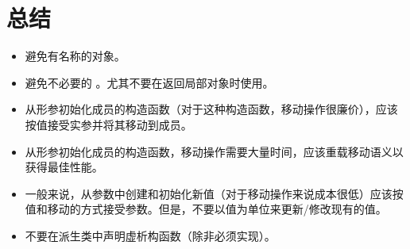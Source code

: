 \section{总结}
\begin{itemize}
	\item 避免有名称的对象。
	\item 避免不必要的 。尤其不要在返回局部对象时使用。
	\item 从形参初始化成员的构造函数（对于这种构造函数，移动操作很廉价），应该按值接受实参并将其移动到成员。
	\item 从形参初始化成员的构造函数，移动操作需要大量时间，应该重载移动语义以获得最佳性能。
	\item 一般来说，从参数中创建和初始化新值（对于移动操作来说成本很低）应该按值和移动的方式接受参数。但是，不要以值为单位来更新/修改现有的值。
	\item 不要在派生类中声明虚析构函数（除非必须实现）。
\end{itemize}


